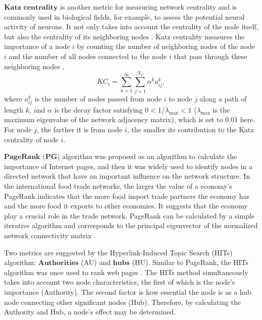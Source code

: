 \documentclass[preprint,3p,times,sort&compress]{elsarticle}
\begin{document}
$\textbf{Katz centrality}$ is another metric for measuring network centrality and is commonly used in biological fields, for example, to assess the potential neural activity of neurons. It not only takes into account the centrality of the node itself, but also the centrality of its neighboring nodes \cite{1953-Katz-Psycho}. Katz centrality measures the importance of a node $i$ by counting the number of neighboring nodes of the node $i$ and the number of all nodes connected to the node $i$ that pass through these neighboring nodes \cite{Peter2014-ProcRSocA-MathPhysEngSci,Li-Chu-Qiao-2020-NeuralNetw},
\begin{equation}\label{Eq:centrality:katz}
KC_{i}=\sum_{k=1}^{\infty} \sum_{j=1}^{N_\mathscr{V}} \alpha^{k} a_{ij}^{k},
\end{equation}
where $a_{ij}^{k}$ is the number of nodes passed from node $i$ to node $j$ along a path of length $k$, and $\alpha$ is the decay factor satisfying $0 <1/\lambda_{\max}<1$ ($\lambda_{\max}$ is the maximum eigenvalue of the network adjacency matrix), which is set to 0.01 here. For node $j$, the farther it is from node $i$, the smaller its contribution to the Katz centrality of node $i$.



$\textbf{PageRank (PG)}$ algorithm was proposed as an algorithm to calculate the importance of Internet pages, and then it was widely used to identify nodes in a directed network that have an important influence on the network structure. In the international food trade networks, the larger the value of a economy's PageRank indicates that the more food import trade partners the economy has and the more food it exports to other economies. It suggests that the economy play a crucial role in the trade network. PageRank can be calculated by a simple iterative algorithm and corresponds to the principal eigenvector of the normalized network connectivity matrix \cite{Brin-Page-1998-ComputNetwISDNSyst}.


Two metrics are suggested by the Hyperlink-Induced Topic Search (HITs) algorithm: $\textbf{Authorities}$ (AU) and $\textbf{hubs}$ (HU). Similar to PageRank, the HITs algorithm was once used to rank web pages \cite{Kleinberg-1999-JACM}. The HITs method simultaneously takes into account two node characteristics, the first of which is the node's importance (Authority). The second factor is how essential the node is as a hub node connecting other significant nodes (Hub). Therefore, by calculating the Authority and Hub, a node's effect may be determined.
\end{document}
